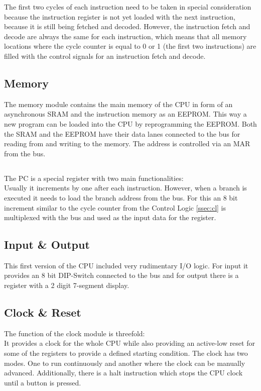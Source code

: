 The first two cycles of each instruction need to be taken in special consideration because the instruction register is not yet loaded with the next instruction, because it is still being fetched and decoded.
However, the instruction fetch and decode are always the same for each instruction, which means that all memory locations where the cycle counter is equal to 0 or 1 (the first two instructions) are filled with the control signals for an instruction fetch and decode.
\subsection{Memory}
The memory module contains the main memory of the \gls{CPU} in form of an asynchronous \gls{SRAM} and the instruction memory as an \gls{EEPROM}.
This way a new program can be loaded into the \gls{CPU} by reprogramming the \gls{EEPROM}.
Both the \gls{SRAM} and the \gls{EEPROM} have their data lanes connected to the bus for reading from and writing to the memory.
The address is controlled via an \gls{MAR} from the bus.
\subsection{}
The \gls{PC} is a special register with two main functionalities:\\
Usually it increments by one after each instruction.
However, when a branch is executed it needs to load the branch address from the bus.
For this an 8 bit increment similar to the cycle counter from the Control Logic \cref{ssec:cl} is multiplexed with the bus and used as the input data for the register.
\subsection{Input \& Output}
This first version of the \gls{CPU} included very rudimentary I/O logic.
For input it provides an 8 bit DIP-Switch connected to the bus and for output there is a register with a 2 digit 7-segment display.
\subsection{Clock \& Reset}
The function of the clock module is threefold:\\
It provides a clock for the whole \gls{CPU} while also providing an active-low reset for some of the registers to provide a defined starting condition.
The clock has two modes. One to run continuously and another where the clock can be manually advanced.
Additionally, there is a halt instruction which stops the \gls{CPU} clock until a button is pressed.

